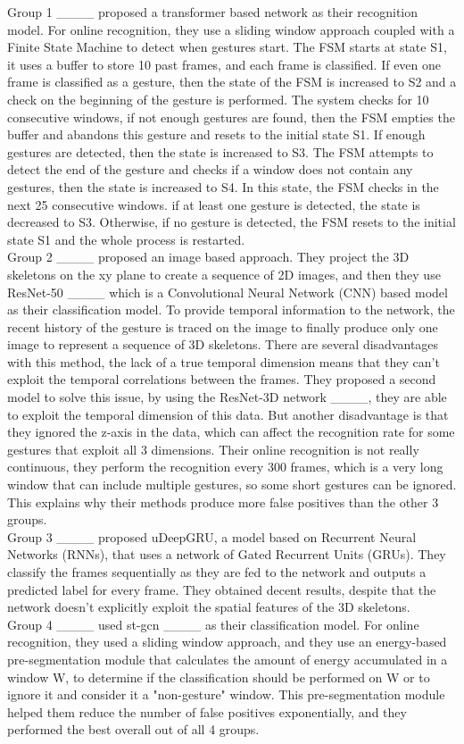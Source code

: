 Group 1 ____ proposed a transformer based network as their recognition model. For online recognition, they use a sliding window approach coupled with a Finite State Machine to detect when gestures start. The FSM starts at state S1, it uses a buffer to store 10 past frames, and each frame is classified. If even one frame is classified as a gesture, then the state of the FSM is increased to S2 and a check on the beginning of the gesture is performed. The system checks for 10 consecutive windows, if not enough gestures are found, then the FSM empties the buffer and abandons this gesture and resets to the initial state S1. If enough gestures are detected, then the state is increased  to S3. The FSM attempts to detect the end of the gesture and checks if a window does not contain any gestures, then the state is increased to S4. In this state, the FSM checks in the next 25 consecutive windows. if at least one gesture is detected, the state is decreased to S3. Otherwise, if no gesture is detected, the FSM resets to the initial state S1 and the whole process is restarted. \\
Group 2 ____ proposed an image based approach. They project the 3D skeletons on the xy plane to create a sequence of 2D images, and then  they use ResNet-50 ____ which is a Convolutional Neural Network (CNN) based model as their classification model. To provide temporal information to the network, the recent history of the gesture is traced on the image to finally produce only one image to represent a sequence of 3D skeletons. There are several disadvantages with this method, the lack of a true temporal dimension means that they can't exploit the temporal correlations between the frames. They proposed a second model to solve this issue, by using the ResNet-3D network ____, they are able to exploit the temporal dimension of this data. But another disadvantage is that they ignored the z-axis in the data, which can affect the recognition rate for some gestures that exploit all 3 dimensions. Their online recognition is not really continuous, they perform the recognition every 300 frames, which is a very long window that can include multiple gestures, so some short gestures can be ignored. This explains why their methods produce more false positives than the other 3 groups. \\
Group 3 ____ proposed uDeepGRU, a model based on Recurrent Neural Networks (RNNs), that uses a network of Gated Recurrent Units (GRUs). They classify the frames sequentially as they are fed to the network and outputs a predicted label for every frame. They obtained decent results, despite that the network doesn't explicitly exploit the spatial features of the 3D skeletons.\\
Group 4 ____ used st-gcn ____ as their classification model. For online recognition, they used a sliding window approach, and they use an energy-based pre-segmentation module that calculates the amount of energy accumulated in a window W, to determine if the classification should be performed on W or to ignore it and consider it a "non-gesture" window. This pre-segmentation module helped them reduce the number of false positives exponentially, and they performed the best overall out of all 4 groups.\\

